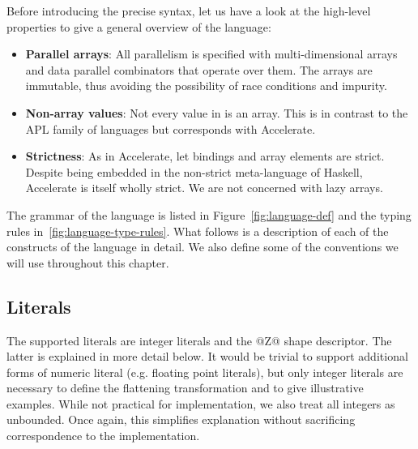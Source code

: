 Before introducing the precise syntax, let us have a look at the high-level properties to give a general overview of the language:
%
\begin{itemize}
\item \textbf{Parallel arrays}: All parallelism is specified with multi-dimensional arrays and data parallel combinators that operate over them. The arrays are immutable, thus avoiding the possibility of race conditions and impurity.
\item \textbf{Non-array values}: Not every value in \ndp{} is an array. This is in contrast to the APL family of languages\cite{Iverson:APL} but corresponds with Accelerate.
\item \textbf{Strictness}: As in Accelerate, let bindings and array elements are strict. Despite being embedded in the non-strict meta-language of Haskell, Accelerate is itself wholly strict. We are not concerned with lazy arrays.
\end{itemize}
%
The grammar of the language is listed in Figure~\ref{fig:language-def} and the typing rules in~\ref{fig:language-type-rules}. What follows is a description of each of the constructs of the language in detail. We also define some of the conventions we will use throughout this chapter.

\subsection{Literals}

The supported literals are integer literals and the @Z@ shape descriptor. The latter is explained in more detail below. It would be trivial to support additional forms of numeric literal (e.g. floating point literals), but only integer literals are necessary to define the flattening transformation and to give illustrative examples. While not practical for implementation, we also treat all integers as unbounded. Once again, this simplifies explanation without sacrificing correspondence to the implementation.

